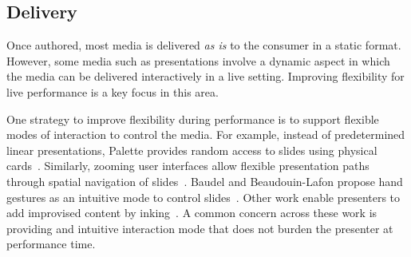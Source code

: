 \subsection{Delivery}
Once authored, most media is delivered \emph{as is} to the consumer in a static format. However, some media such as presentations involve a dynamic aspect in which the media can be delivered interactively in a live setting. Improving flexibility for live performance is a key focus in this area.

\begin{mldescription}
 One strategy to improve flexibility during performance is to support flexible modes of interaction to control the media. For example, instead of predetermined linear presentations, Palette provides random access to slides using physical cards~\cite{nelson1999palette}. Similarly, zooming user interfaces allow flexible presentation paths through spatial navigation of slides~\cite{lichtschlag2009fly,good2002zoomable}. Baudel and Beaudouin-Lafon propose hand gestures as an intuitive mode to control slides~\cite{baudel1993charade}. Other work enable presenters to add improvised content by inking~\cite{anderson2007classroom,golub2004handwritten}. A common concern across these work is providing and intuitive interaction mode that does not burden the presenter at performance time.\\ 
\end{mldescription}


 

